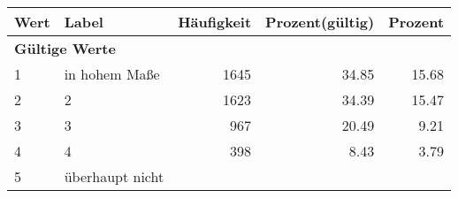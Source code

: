      \begin{longtable}{lXrrr}
     \toprule
     \textbf{Wert} & \textbf{Label} & \textbf{Häufigkeit} & \textbf{Prozent(gültig)} & \textbf{Prozent} \\
     \endhead
     \midrule
     \multicolumn{5}{l}{\textbf{Gültige Werte}}\\

     1 &
     \multicolumn{1}{X}{ in hohem Maße   } &


       \num{1645} &
       \num[round-mode=places,round-precision=2]{34.85} &
         \num[round-mode=places,round-precision=2]{15.68} \\

     2 &
     \multicolumn{1}{X}{ 2   } &


       \num{1623} &
       \num[round-mode=places,round-precision=2]{34.39} &
         \num[round-mode=places,round-precision=2]{15.47} \\

     3 &
     \multicolumn{1}{X}{ 3   } &


       \num{967} &
       \num[round-mode=places,round-precision=2]{20.49} &
         \num[round-mode=places,round-precision=2]{9.21} \\

     4 &
     \multicolumn{1}{X}{ 4   } &


       \num{398} &
       \num[round-mode=places,round-precision=2]{8.43} &
         \num[round-mode=places,round-precision=2]{3.79} \\

     5 &
     \multicolumn{1}{X}{ überhaupt nicht   } &



\end{longtable}
